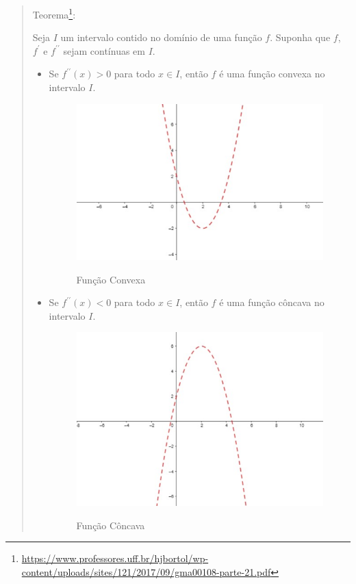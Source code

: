 \documentclass[12pt, a4paper]{article}
\begin{document}
\begin{quote}
	Teorema\footnote{\url{https://www.professores.uff.br/hjbortol/wp-content/uploads/sites/121/2017/09/gma00108-parte-21.pdf}}:
	
	Seja $I$ um intervalo contido no domínio de uma função $f$. Suponha que $f$, $f^{\prime}$ e $f^{\prime \prime}$ sejam contínuas em $I$. 
	
	\begin{itemize}
		\item Se $f^{\prime \prime} (x) > 0$ para todo $x \in I$, então $f$ é uma função convexa no intervalo $I$.
		
		\begin{figure}[h]
			\caption{Função Convexa}
			\centering
			\includegraphics[scale=.73]{images/convexa.jpg}
			\label{fig:convexa}
		\end{figure}
	
	
		\item Se $f^{\prime \prime} (x) < 0$ para todo $x \in I$, então $f$ é uma função côncava no intervalo $I$.
		
		\begin{figure}[h]
			\caption{Função Côncava}
			\centering
			\includegraphics[scale=.73]{images/concava.jpg}
			\label{fig:concava}
		\end{figure}
	\end{itemize}
\end{quote}
\end{document}
